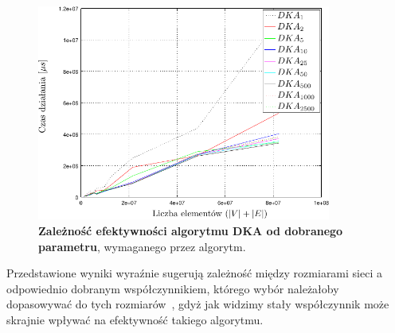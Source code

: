 \begin{figure}[!htbp]
	\null\hfill
	\includegraphics[width=0.86\textwidth]{Chapter_IV/DKA-param_psfrag.pdf}
	\hfill\null
	\caption{
		\textbf{Zależność efektywności algorytmu DKA od dobranego parametru}, wymaganego przez algorytm.
	}
	\label{fig:plotDKA-param}
\end{figure}

Przedstawione wyniki wyraźnie sugerują zależność między rozmiarami sieci a odpowiednio dobranym współczynnikiem, którego wybór należałoby dopasowywać do tych rozmiarów~\cite[$3.3.2$,$3.10.3$]{Dissertation}, gdyż jak widzimy stały współczynnik może skrajnie wpływać na efektywność takiego algorytmu.